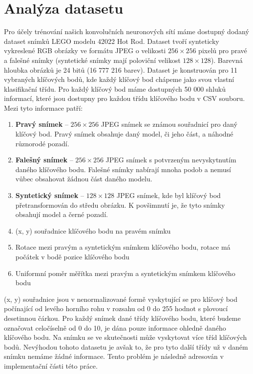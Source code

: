 \section{Analýza datasetu}
\label{sec:Chapter31}
Pro účely trénování našich konvolučních neuronových sítí máme dostupný dodaný dataset snímků LEGO modelu 42022 Hot Rod. Dataset tvoří synteticky vykreslené RGB obrázky ve formátu JPEG o velikosti $256\times256$ pixelů pro pravé a falešné snímky (syntetické snímky mají poloviční velikost $128\times128$). Barevná hloubka obrázků je 24 bitů (16 777 216 barev). Dataset je konstruován pro 11 vybraných klíčových bodů, kde každý klíčový bod chápeme jako svou vlastní klasifikační třídu. Pro každý klíčový bod máme dostupných 50 000 shluků informací, které jsou dostupny pro každou třídu klíčového bodu v CSV souboru. Mezi tyto informace patří:
\begin{enumerate}
  \item \textbf{Pravý snímek} -- $256\times256$ JPEG snímek se známou souřadnicí pro daný klíčový bod. Pravý snímek obsahuje daný model, či jeho část, a náhodné různorodé pozadí.
  \item \textbf{Falešný snímek} -- $256\times256$ JPEG snímek s potvrzeným nevyskytnutím daného klíčového bodu. Falešné snímky nabírají mnoha podob a nemusí vůbec obsahovat žádnou část daného modelu.
  \item \textbf{Syntetický snímek} -- $128\times128$ JPEG snímek, kde byl klíčový bod přetransformován do středu obrázku. K povšimnutí je, že tyto snímky obsahují model a černé pozadí.
  \item (x, y) souřadnice klíčového bodu na pravém snímku
  \item Rotace mezi pravým a syntetickým snímkem klíčového bodu, rotace má počátek v bodě pozice klíčového bodu
  \item Uniformní poměr měřítka mezi pravým a syntetickým snímkem klíčového bodu
\end{enumerate}

(x, y) souřadnice jsou v nenormalizované formě vyskytující se pro klíčový bod počínající od levého horního rohu v rozsahu od 0 do 255 hodnot s plovoucí desetinnou čárkou. Pro každý snímek dané třídy klíčového bodu, které budeme označovat celočíselně od 0 do 10, je dána pouze informace ohledně daného klíčového bodu. Na snímku se ve skutečnosti může vyskytovat více tříd klíčových bodů. Nevýhodou tohoto datasetu je avšak to, že pro tyto další třídy už v daném snímku nemáme žádné informace. Tento problém je následně adresován v implementační části této práce.



